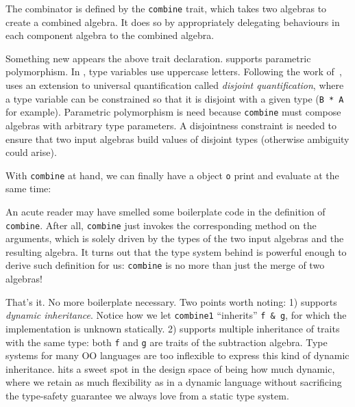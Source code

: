 The combinator is defined by the \lstinline{combine} trait, which takes two
algebras to create a combined algebra. It does so by appropriately delegating
behaviours in each component algebra to the combined algebra.


Something new appears the above trait declaration. \name supports parametric
polymorphism. In \name, type variables use uppercase letters. Following the work
of~\citet{alpuimdisjoint}, \name uses an extension to universal quantification
called \textit{disjoint quantification}, where a type variable can be
constrained so that it is disjoint with a given type (\lstinline{B * A} for
example). Parametric polymorphism is need because \lstinline{combine} must
compose algebras with arbitrary type parameters. A disjointness constraint is
needed to ensure that two input algebras build values of disjoint types
(otherwise ambiguity could arise).

With \lstinline{combine} at hand, we can finally have a object \lstinline{o}
print and evaluate at the same time:


An acute reader may have smelled some boilerplate code in the definition of
\lstinline{combine}. After all, \lstinline{combine} just invokes the
corresponding method on the arguments, which is solely driven by the types of
the two input algebras and the resulting algebra. It turns out that the type
system behind \name is powerful enough to derive such definition for us:
\lstinline{combine} is no more than just the merge of two algebras!


That's it. No more boilerplate necessary. Two points worth noting: 1) \name
supports \textit{dynamic inheritance}. Notice how we let \lstinline{combine1}
``inherits'' \lstinline{f & g}, for which the implementation is unknown
statically. 2) \name supports multiple inheritance of traits with the same type:
both \lstinline{f} and \lstinline{g} are traits of the subtraction algebra. Type
systems for many OO languages are too inflexible to express this kind of dynamic
inheritance. \name hits a sweet spot in the design space of being how much
dynamic, where we retain as much flexibility as in a dynamic language without
sacrificing the type-safety guarantee we always love from a static type system.
